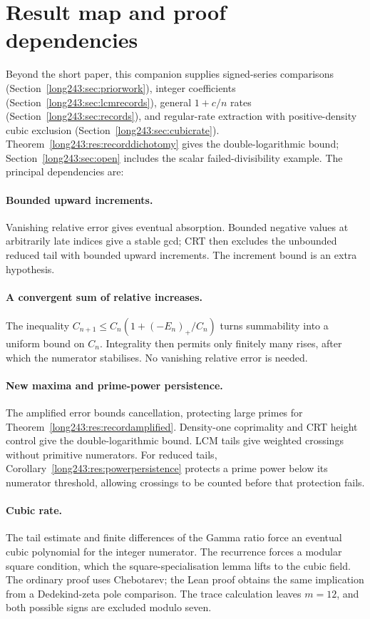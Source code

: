 \section{Result map and proof dependencies}\label{sec:erdos-243-complete-family-map}
Beyond the short paper, this companion supplies signed-series
comparisons (Section~\ref{long243:sec:priorwork}), integer coefficients
(Section~\ref{long243:sec:lcmrecords}), general $1+c/n$ rates
(Section~\ref{long243:sec:records}), and regular-rate extraction with
positive-density cubic exclusion (Section~\ref{long243:sec:cubicrate}).
Theorem~\ref{long243:res:recorddichotomy} gives the double-logarithmic
bound; Section~\ref{long243:sec:open} includes the scalar
failed-divisibility example. The principal dependencies are:

\paragraph{Bounded upward increments.}
Vanishing relative error gives eventual absorption. Bounded negative
values at arbitrarily late indices give a stable gcd; CRT then excludes
the unbounded reduced tail with bounded upward increments. The increment
bound is an extra hypothesis.

\paragraph{A convergent sum of relative increases.}
The inequality $C_{n+1}\le C_n(1+(-E_n)_+/C_n)$ turns summability into a
uniform bound on $C_n$. Integrality then permits only finitely many rises,
after which the numerator stabilises.
No vanishing relative error is needed.

\paragraph{New maxima and prime-power persistence.}
The amplified error bounds cancellation, protecting large primes
for Theorem~\ref{long243:res:recordamplified}. Density-one coprimality
and CRT height control give the double-logarithmic bound. LCM tails
give weighted crossings without primitive numerators. For reduced
tails, Corollary~\ref{long243:res:powerpersistence} protects a prime
power below its numerator threshold, allowing crossings to be counted
before that protection fails.

\paragraph{Cubic rate.}
The tail estimate and finite differences of the Gamma ratio force an
eventual cubic polynomial for the integer numerator. The recurrence forces a modular square condition, which the square-specialisation
lemma lifts to the cubic field. The ordinary proof uses Chebotarev; the Lean
proof obtains the same implication from a Dedekind-zeta pole comparison.
The trace calculation leaves $m=12$, and both possible signs are excluded
modulo seven.

